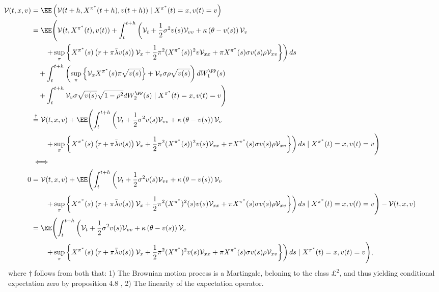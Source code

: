 \documentclass[11pt]{article}
\numberwithin{equation}{section}
\newcommand{\lc}{\left\{}
\newcommand{\rc}{\right\}}
\begin{document}
\begin{equation*}
    \hspace*{-1.7cm}
    \begin{aligned}
    \mathcal{V}(t, x, v) &= \EE \left( \mathcal{V}(t+h, X^{\pi^*}(t+h), v(t+h)) \mid X^{\pi^*}(t)=x,v(t)=v \right )\\
    &= \EE \Biggl( \mathcal{V}(t, X^{\pi^*}(t), v(t)) + \int_{t}^{t+h} \left( \mathcal{V}_t + \frac{1}{2} \sigma^2 v (s) \mathcal{V}_{vv} + \kappa \left( \theta - v(s) \right) \mathcal{V}_v \right. \\
    &\quad \quad \left. + \sup_\pi \lc X^{\pi^*}(s) \left( r + \pi \bar{\lambda} v(s) \right) \mathcal{V}_x + \frac{1}{2} \pi^2 (X^{\pi^*}(s))^2 v \mathcal{V}_{xx} + \pi X^{\pi^*}(s) \sigma v(s) \rho \mathcal{V}_{xv} \rc \right) ds \\
    &\quad + \int_{t}^{t+h} \left( \sup_\pi \lc \mathcal{V}_x X^{\pi^*}(s) \pi \sqrt{v(s)} \rc + \mathcal{V}_v \sigma \rho \sqrt{v(s)} \right) dW^\PP_1(s) \\
    &\quad + \int_{t}^{t+h} \mathcal{V}_v \sigma \sqrt{v(s)} \sqrt{1 - \rho^2} dW^\PP_2(s) \mid X^{\pi^*}(t)=x,v(t)=v  \Biggr) \\
    &\overset{\dagger}{=} \mathcal{V}(t, x, v) + \EE \Biggl( \int_{t}^{t+h} \left( \mathcal{V}_t + \frac{1}{2} \sigma^2 v (s) \mathcal{V}_{vv} + \kappa \left( \theta - v(s) \right) \mathcal{V}_v \right. \\
    &\quad \quad  \left. + \sup_\pi \lc X^{\pi^*}(s) \left( r + \pi \bar{\lambda} v(s) \right) \mathcal{V}_x + \frac{1}{2} \pi^2 (X^{\pi^*}(s))^2 v(s) \mathcal{V}_{xx} + \pi X^{\pi^*}(s) \sigma v(s) \rho \mathcal{V}_{xv} \rc \right) ds \mid X^{\pi^*}(t)=x,v(t)=v \Biggr)\\
    &\iff\\
    0 &= \mathcal{V}(t, x, v) + \EE \Biggl( \int_{t}^{t+h} \left( \mathcal{V}_t + \frac{1}{2} \sigma^2 v (s) \mathcal{V}_{vv} + \kappa \left( \theta - v(s) \right) \mathcal{V}_v \right. \\
    &\quad \quad  \left. + \sup_\pi \lc X^{\pi^*}(s) \left( r + \pi \bar{\lambda} v(s) \right) \mathcal{V}_x + \frac{1}{2} \pi^2 (X^{\pi^*})^2(s) v(s) \mathcal{V}_{xx} + \pi X^{\pi^*}(s) \sigma v(s) \rho \mathcal{V}_{xv} \rc \right) ds \mid X^{\pi^*}(t)=x,v(t)=v \Biggr) - \mathcal{V}(t, x, v) \\
    &=\EE \Biggl( \int_{t}^{t+h} \left( \mathcal{V}_t + \frac{1}{2} \sigma^2 v (s) \mathcal{V}_{vv} + \kappa \left( \theta - v(s) \right) \mathcal{V}_v \right. \\
    &\quad\quad  \left. + \sup_\pi \lc X^{\pi^*}(s) \left( r + \pi \bar{\lambda} v(s) \right) \mathcal{V}_x + \frac{1}{2} \pi^2 (X^{\pi^*})^2 v(s) \mathcal{V}_{xx} + \pi X^{\pi^*}(s) \sigma v(s) \rho \mathcal{V}_{xv} \rc \right) ds \mid X^{\pi^*}(t)=x,v(t)=v \Biggr),
    \end{aligned}
\end{equation*}
where $\dagger$ follows from both that: 1) The Brownian motion process is a
Martingale, beloning to the class $\pounds^2$,
and thus yielding conditional expectation zero by proposition 4.8 \cite{bjork2020}, 2) The linearity of the expectation operator.
\end{document}
